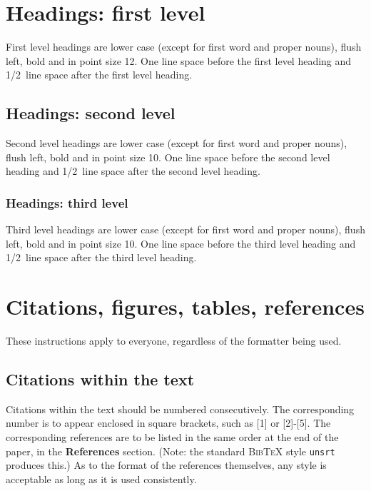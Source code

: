 \documentclass{article}
\begin{document}
\section{Headings: first level}
\label{headings}

First level headings are lower case (except for first word and proper nouns),
flush left, bold and in point size 12. One line space before the first level
heading and 1/2~line space after the first level heading.

\subsection{Headings: second level}

Second level headings are lower case (except for first word and proper nouns),
flush left, bold and in point size 10. One line space before the second level
heading and 1/2~line space after the second level heading.

\subsubsection{Headings: third level}

Third level headings are lower case (except for first word and proper nouns),
flush left, bold and in point size 10. One line space before the third level
heading and 1/2~line space after the third level heading.

\section{Citations, figures, tables, references}
\label{others}

These instructions apply to everyone, regardless of the formatter being used.

\subsection{Citations within the text}

Citations within the text should be numbered consecutively. The corresponding
number is to appear enclosed in square brackets, such as [1] or [2]-[5]. The
corresponding references are to be listed in the same order at the end of the
paper, in the \textbf{References} section. (Note: the standard
\textsc{Bib\TeX} style \texttt{unsrt} produces this.) As to the format of the
references themselves, any style is acceptable as long as it is used
consistently.
\end{document}
